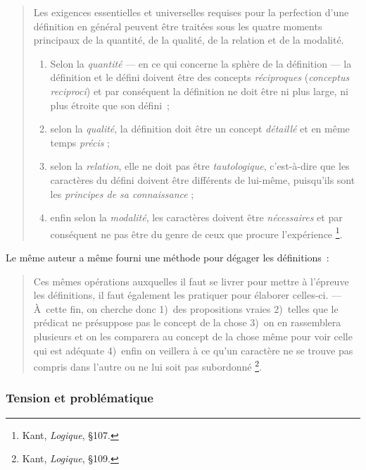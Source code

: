 \documentclass[a4paper]{article}
\begin{document}
\begin{quote}
  Les exigences essentielles et universelles requises pour la
  perfection d'une définition en général peuvent être traitées sous les
  quatre moments principaux de la quantité, de la qualité, de la
  relation et de la modalité.

\begin{enumerate}
\item Selon la \emph{quantité} --- en ce qui concerne la sphère de la
     définition --- la définition et le défini doivent être des concepts
     \emph{réciproques} (\emph{conceptus reciproci}) et par conséquent la
     définition ne doit être ni plus large, ni plus étroite que son
     défini ;
\item selon la \emph{qualité}, la définition doit être un concept \emph{détaillé}
     et en même temps \emph{précis} ;
\item selon la \emph{relation}, elle ne doit pas être \emph{tautologique},
     c'est-à-dire que les caractères du défini doivent être différents
     de lui-même, puisqu'ils sont les \emph{principes de sa connaissance} ;
\item enfin selon la \emph{modalité}, les caractères doivent être
     \emph{nécessaires} et par conséquent ne pas être du genre de ceux que
     procure l'expérience \footnote{Kant, \emph{Logique}, §107.
 }.
\end{enumerate}

\end{quote}

Le même auteur a même fourni une méthode pour dégager les définitions :

\begin{quote}
Ces mêmes opérations auxquelles il faut se livrer pour mettre à
l'épreuve les définitions, il faut également les pratiquer pour
élaborer celles-ci. --- À cette fin, on cherche donc 1) des
propositions vraies 2) telles que le prédicat ne présuppose pas le
concept de la chose 3) on en rassemblera plusieurs et on les comparera
au concept de la chose même pour voir celle qui est adéquate 4) enfin
on veillera à ce qu'un caractère ne se trouve pas compris dans l'autre
ou ne lui soit pas subordonné \footnote{Kant, \emph{Logique}, §109.
 }.
\end{quote}
\subsubsection{Tension et problématique}
\label{sec-2-2-2}
\end{document}
